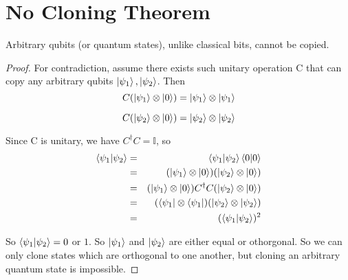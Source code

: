 
\chapter{No Cloning Theorem} %

\label{AppendixC} %

\begin{theorem} \label{no-cloning thm}
Arbitrary qubits (or quantum states), unlike classical bits, cannot be copied. 
\end{theorem} 

\begin{proof} \cite{Wehner:notes}
For contradiction, assume there exists such unitary operation C that can copy any arbitrary qubits $\ket{\psi_1}, \ket{\psi_2}$. Then
\begin{equation*}
    C(\ket{\psi_1} \otimes \ket{0})=\ket{\psi_1} \otimes \ket{\psi_1}
\end{equation*}

\begin{equation*}
C(\ket{\psi_2} \otimes \ket{0})=\ket{\psi_2} \otimes \ket{\psi_2}  
\end{equation*}
    

Since C is unitary, we have $C^\dagger C=\mathbb{I}$, so
\begin{eqnarray*}
\braket{\psi_1|\psi_2}&=&\braket{\psi_1|\psi_2}\braket{0|0}\\
&=&(\ket{\psi_1} \otimes \ket{0})(\ket{\psi_2} \otimes \ket{0})\\
&=&(\ket{\psi_1} \otimes \ket{0})C^\dagger C(\ket{\psi_2} \otimes \ket{0})\\
&=&(\bra{\psi_1} \otimes \bra{\psi_1})(\ket{\psi_2} \otimes \ket{\psi_2})\\
&=&(\braket{\psi_1 |\psi_2})^2
\end{eqnarray*}

So $\braket{\psi_1 | \psi_2}=0$ or $1$. So $\ket{\psi_1}$ and $\ket{\psi_2}$ are either equal or othorgonal. So we can only clone states which are orthogonal to one another, but cloning an arbitrary quantum state is impossible. 
\end{proof}